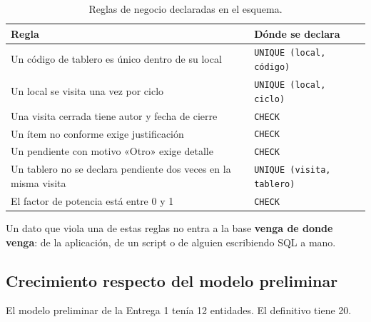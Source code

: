 \documentclass[10pt,letterpaper]{article}
\begin{document}
\begin{table}[H]
\centering
\small
\begin{tabular}{@{}p{8.5cm}p{6.5cm}@{}}
\toprule
\textbf{Regla} & \textbf{Dónde se declara} \\
\midrule
Un código de tablero es único dentro de su local & \texttt{UNIQUE (local, código)} \\
Un local se visita una vez por ciclo & \texttt{UNIQUE (local, ciclo)} \\
Una visita cerrada tiene autor y fecha de cierre & \texttt{CHECK} \\
Un ítem no conforme exige justificación & \texttt{CHECK} \\
Un pendiente con motivo «Otro» exige detalle & \texttt{CHECK} \\
Un tablero no se declara pendiente dos veces en la misma visita & \texttt{UNIQUE (visita, tablero)} \\
El factor de potencia está entre 0 y 1 & \texttt{CHECK} \\
\bottomrule
\end{tabular}
\caption{Reglas de negocio declaradas en el esquema.}
\end{table}

Un dato que viola una de estas reglas no entra a la base \textbf{venga de donde
venga}: de la aplicación, de un script o de alguien escribiendo SQL a mano.
\newpage
\subsection{Crecimiento respecto del modelo preliminar}

El modelo preliminar de la Entrega 1 tenía 12 entidades. El definitivo tiene
20.
\end{document}
